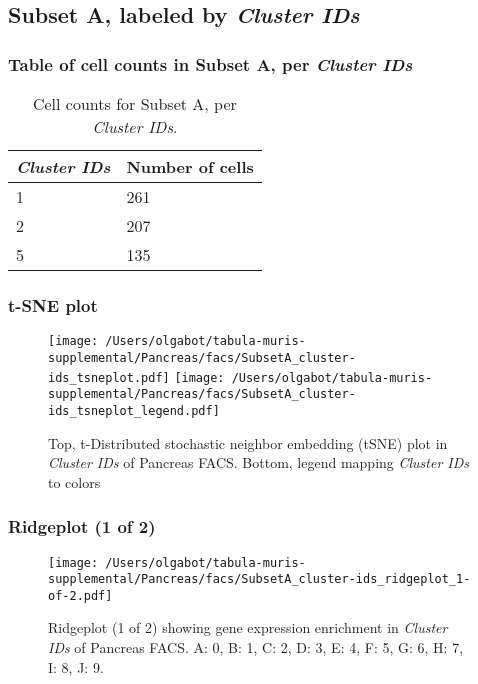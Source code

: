 \clearpage

\subsection{Subset A, labeled by \emph{Cluster IDs}}
\subsubsection{Table of cell counts in Subset A, per \emph{Cluster IDs}}\begin{table}[h]
\centering
\label{my-label}
\begin{tabular}{@{}ll@{}}
\toprule

\emph{Cluster IDs}& Number of cells \\ \midrule
1 & 261 \\

2 & 207 \\

5 & 135 \\
\bottomrule
\end{tabular}
\caption{Cell counts for Subset A, per \emph{Cluster IDs}.}
\end{table}

\clearpage
\subsubsection{t-SNE plot}
\begin{figure}[h]
\centering
\texttt{[image: /Users/olgabot/tabula-muris-supplemental/Pancreas/facs/SubsetA\_cluster-ids\_tsneplot.pdf]}
\texttt{[image: /Users/olgabot/tabula-muris-supplemental/Pancreas/facs/SubsetA\_cluster-ids\_tsneplot\_legend.pdf]}
\caption{Top, t-Distributed stochastic neighbor embedding (tSNE) plot  in \emph{Cluster IDs} of Pancreas FACS. Bottom, legend mapping \emph{Cluster IDs} to colors}
\end{figure}


\clearpage

\subsubsection{Ridgeplot (1 of 2)}
\begin{figure}[h]
\centering
\texttt{[image: /Users/olgabot/tabula-muris-supplemental/Pancreas/facs/SubsetA\_cluster-ids\_ridgeplot\_1-of-2.pdf]}

\caption{ Ridgeplot (1 of 2)  showing gene expression enrichment in \emph{Cluster IDs} of Pancreas FACS. A: 0, B: 1, C: 2, D: 3, E: 4, F: 5, G: 6, H: 7, I: 8, J: 9.}
\end{figure}


